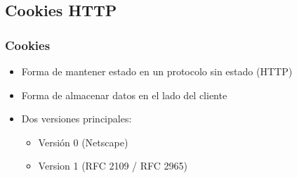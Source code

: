 %
{\bf
  \textcolor[rgb]{1,1,1}{
    \section{Cookies HTTP}
  }
}

\usebackgroundtemplate{}

\begin{frame}
\frametitle{Cookies}

\begin{itemize}
\item Forma de mantener estado en un protocolo sin estado (HTTP)
\item Forma de almacenar datos en el lado del cliente
\item Dos versiones principales:
  \begin{itemize}
  \item Versión 0 (Netscape)
  \item Version 1 (RFC 2109 / RFC 2965)
  \end{itemize}
\end{itemize}
\end{frame}


